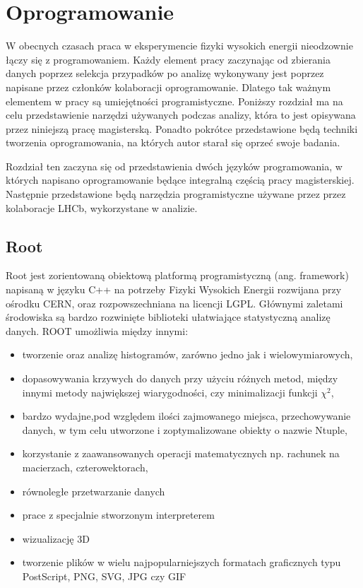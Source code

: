 \chapter{Oprogramowanie}
W obecnych czasach praca w eksperymencie fizyki wysokich energii nieodzownie łączy się z programowaniem. Każdy element pracy zaczynając od zbierania danych poprzez selekcja przypadków po analizę wykonywany jest poprzez napisane przez członków kolaboracji oprogramowanie. Dlatego tak ważnym elementem w pracy są umiejętności programistyczne. Poniższy rozdział ma na celu przedstawienie narzędzi używanych podczas analizy, która to jest opisywana przez niniejszą pracę magisterską. Ponadto pokrótce przedstawione będą techniki tworzenia oprogramowania, na których autor starał się oprzeć swoje badania.

Rozdział ten zaczyna się od przedstawienia dwóch języków programowania, w których napisano oprogramowanie będące integralną częścią pracy magisterskiej. Następnie przedstawione będą narzędzia programistyczne używane przez przez kolaboracje LHCb, wykorzystane w analizie. 

\section{Root}
Root \cite{ROOT} jest zorientowaną obiektową platformą programistyczną (ang. framework) napisaną w języku C++ na potrzeby Fizyki Wysokich Energii rozwijana przy ośrodku CERN, oraz rozpowszechniana na licencji LGPL. Głównymi zaletami środowiska są bardzo rozwinięte biblioteki ułatwiające statystyczną analizę danych. ROOT umożliwia między innymi:
\begin{itemize}
 \item tworzenie oraz analizę histogramów, zarówno jedno jak i wielowymiarowych,
 \item dopasowywania krzywych do danych przy użyciu różnych metod, między innymi metody największej wiarygodności, czy minimalizacji funkcji $\chi^2 $,
\item bardzo wydajne,pod względem ilości zajmowanego miejsca, przechowywanie danych, w tym celu utworzone i zoptymalizowane obiekty o nazwie Ntuple,
\item korzystanie z zaawansowanych operacji matematycznych np. rachunek na macierzach, czterowektorach,
\item równoległe przetwarzanie danych
\item prace z specjalnie stworzonym interpreterem 
\item wizualizację 3D
\item tworzenie plików w wielu najpopularniejszych formatach graficznych typu  PostScript, PNG, SVG, JPG czy GIF
 \end{itemize}
